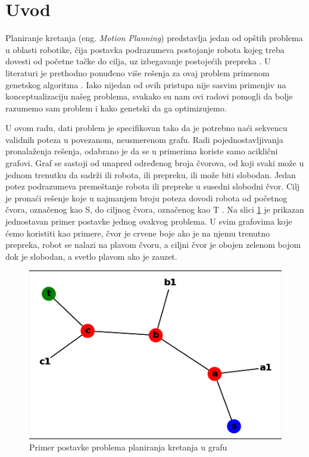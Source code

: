 \documentclass[12pt]{article}
\begin{document}
	\section{Uvod}
	\label{sec:uvod}  
	\par Planiranje kretanja (eng. \textit{Motion Planning}) predstavlja jedan od opštih problema u oblasti robotike, čija postavka podrazumeva postojanje robota kojeg treba dovesti od početne tačke do cilja, uz izbegavanje postojećih prepreka \cite{def}. U literaturi je prethodno ponuđeno više rešenja za ovaj problem primenom genetskog algoritma 
	\cite{gen2, gen1, gen3}. Iako nijedan od ovih pristupa nije sasvim primenjiv na konceptualizaciju našeg problema, svakako su nam ovi radovi pomogli da bolje razumemo sam problem i kako genetski da ga optimizujemo. 
	\par U ovom radu, dati problem je specifikovan tako da je  potrebno naći sekvencu validnih poteza u povezanom, neusmerenom grafu. Radi pojednostavljivanja pronalaženja rešenja, odabrano je da se u primerima koriste samo aciklični grafovi. Graf se sastoji od unapred određenog broja čvorova, od koji svaki može u jednom trenutku da sadrži ili robota, ili prepreku, ili može biti slobodan. Jedan potez podrazumeva premeštanje robota ili prepreke u susedni slobodni čvor. Cilj je pronaći rešenje koje u najmanjem broju poteza dovodi robota od početnog čvora, označenog kao S, do ciljnog čvora, označenog kao T \cite{glavni}. 
	Na slici \ref{fig:slika1} je prikazan jednostavan primer postavke jednog ovakvog problema. U svim grafovima koje ćemo koristiti kao primere, čvor je crvene boje ako je na njemu trenutno prepreka, robot se nalazi na plavom čvoru, a ciljni čvor je obojen zelenom bojom dok je slobodan, a svetlo plavom ako je zauzet.
	\vspace*{1\baselineskip}
	\begin{figure}[h!]
		\begin{center}
			\includegraphics[scale=1]{graf.png}
		\end{center}
		\caption{Primer postavke problema planiranja kretanja u grafu}
		\label{fig:slika1}
	\end{figure}
	
\end{document}
